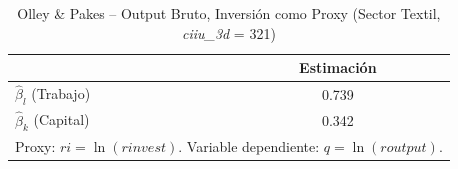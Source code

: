 \begin{table}[H]
\centering
\caption{Olley \& Pakes -- Output Bruto, Inversión como Proxy (Sector Textil, \textit{ciiu\_3d} = 321)}
\begin{tabular}{lc}
\toprule
 & Estimación \\
\midrule
$\hat{\beta}_l$ (Trabajo) & 0.739 \\
$\hat{\beta}_k$ (Capital) & 0.342 \\
\bottomrule
\multicolumn{2}{l}{\small Proxy: $ri = \ln(\mathit{rinvest})$. Variable dependiente: $q = \ln(\mathit{routput})$.}
\end{tabular}
\end{table}
